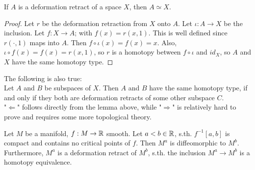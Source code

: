 \begin{lemma}
   If $A$ is a deformation retract of a space $X$, then $A \simeq X$.
\end{lemma}

\begin{proof}
   Let $r$ be the deformation retraction from $X$ onto $A$. Let 
   $\iota: A \rightarrow X$ be the inclusion. Let 
   $f: X \rightarrow A$; with $f(x) = r(x, 1)$. This is well defined since 
   $r(\cdot, 1)$ maps into $A$. Then $f \circ \iota (x) = f(x) = x$. Also, 
   $\iota \circ f(x) = f(x) = r(x, 1)$, so $r$ is a homotopy between 
   $f \circ \iota$ and $id_X$, so $A$ and $X$ have the same homotopy type.
\end{proof}

\begin{remark}
   The following is also true: \\
   Let $A$ and $B$ be subspaces of $X$. Then
   $A$ and $B$ have the same homotopy type, if and only if they both are 
   deformation retracts of some other subspace $C$. \\
   "$\Leftarrow$" follows directly from the lemma above, while "$\Rightarrow$"
   is relatively hard to prove and requires some more topological theory.
\end{remark}

\begin{theorem}
   \label{theorem:1st deformation lemma}
   Let $M$ be a manifold, $f: M \rightarrow {\mathbb R}$ smooth. Let $a < b \in {\mathbb R}$, 
   s.th. $f^{-1}[a, b]$ is compact and contains no critical points of $f$. Then 
   $M^a$ is diffeomorphic to $M^b$. \\ 
   Furthermore, $M^a$ is a deformation retract of $M^b$, s.th. the 
   inclusion $M^a \rightarrow M^b$ is a homotopy equivalence.
\end{theorem}

